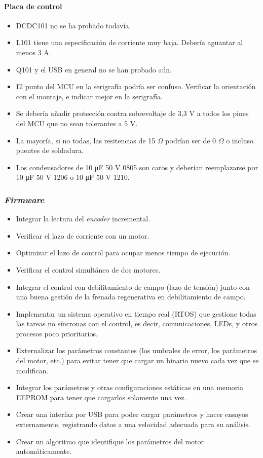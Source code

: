 \paragraph{Placa de control}
\begin{itemize}
	\item DCDC101 no se ha probado todavía.
	\item L101 tiene una especificación de corriente muy baja. Debería aguantar al menos 3 A.
	\item Q101 y el USB en general no se han probado aún.
	\item El punto del MCU en la serigrafía podría ser confuso. Verificar la orientación con el montaje, e indicar mejor en la serigrafía.
	\item Se debería añadir protección contra sobrevoltaje de 3,3 V a todos los pines del MCU que no sean tolerantes a 5 V.
	\item La mayoría, si no todas, las resitencias de 15 $\Omega$ podrían ser de 0 $\Omega$ o incluso puentes de soldadura.
	\item Los condensadores de 10 \unit{\micro\farad} 50 V 0805 son caros y deberían reemplazarse por 10 \unit{\micro\farad} 50 V 1206 o 10 \unit{\micro\farad} 50 V 1210.
\end{itemize}

\subsubsection{\textit{Firmware}}

\begin{itemize}
	\item Integrar la lectura del \textit{encoder} incremental.
	\item Verificar el lazo de corriente con un motor.
	\item Optimizar el lazo de control para ocupar menos tiempo de ejecución.
	\item Verificar el control simultáneo de dos motores.
	\item Integrar el control con debilitamiento de campo (lazo de tensión) junto con una buena gestión de la frenada regenerativa en debilitamiento de campo.
	\item Implementar un sistema operativo en tiempo real (RTOS) que gestione todas las tareas no síncronas con el control, es decir, comunicaciones, LEDs, y otros procesos poco prioritarios.
	\item Externalizar los parámetros constantes (los umbrales de error, los parámetros del motor, etc.) para evitar tener que cargar un binario nuevo cada vez que se modifican.
	\item Integrar los parámetros y otras configuraciones estáticas en una memoria EEPROM para tener que cargarlos solamente una vez.
	\item Crear una interfaz por USB para poder cargar parámetros y hacer ensayos externamente, registrando datos a una velocidad adecuada para su análisis.
	\item Crear un algoritmo que identifique los parámetros del motor automáticamente.
\end{itemize}